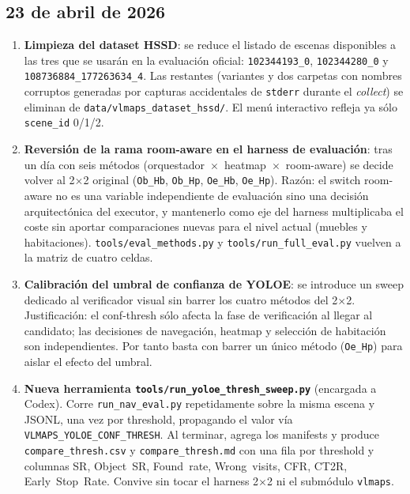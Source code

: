 \subsection*{23 de abril de 2026}

\begin{enumerate}

  \item \textbf{Limpieza del dataset HSSD}: se reduce el listado de escenas
        disponibles a las tres que se usarán en la evaluación oficial:
        \texttt{102344193\_0}, \texttt{102344280\_0} y
        \texttt{108736884\_177263634\_4}. Las restantes (variantes y dos
        carpetas con nombres corruptos generadas por capturas accidentales de
        \texttt{stderr} durante el \emph{collect}) se eliminan de
        \texttt{data/vlmaps\_dataset\_hssd/}. El menú interactivo refleja ya
        sólo \texttt{scene\_id} 0/1/2.

  \item \textbf{Reversión de la rama room-aware en el harness de evaluación}:
        tras un día con seis métodos
        (orquestador~$\times$~heatmap~$\times$~room-aware) se decide volver al
        2$\times$2 original (\texttt{Ob\_Hb}, \texttt{Ob\_Hp}, \texttt{Oe\_Hb},
        \texttt{Oe\_Hp}). Razón: el switch room-aware no es una variable
        independiente de evaluación sino una decisión arquitectónica del
        executor, y mantenerlo como eje del harness multiplicaba el coste sin
        aportar comparaciones nuevas para el nivel actual (muebles y
        habitaciones). \texttt{tools/eval\_methods.py} y
        \texttt{tools/run\_full\_eval.py} vuelven a la matriz de cuatro celdas.

  \item \textbf{Calibración del umbral de confianza de YOLOE}: se introduce un
        sweep dedicado al verificador visual sin barrer los cuatro métodos del
        2$\times$2. Justificación: el conf-thresh sólo afecta la fase de
        verificación al llegar al candidato; las decisiones de navegación,
        heatmap y selección de habitación son independientes. Por tanto basta
        con barrer un único método (\texttt{Oe\_Hp}) para aislar el efecto del
        umbral.

  \item \textbf{Nueva herramienta \texttt{tools/run\_yoloe\_thresh\_sweep.py}}
        (encargada a Codex). Corre \texttt{run\_nav\_eval.py} repetidamente
        sobre la misma escena y JSONL, una vez por threshold, propagando el
        valor vía \texttt{VLMAPS\_YOLOE\_CONF\_THRESH}. Al terminar, agrega los
        manifests y produce \texttt{compare\_thresh.csv} y
        \texttt{compare\_thresh.md} con una fila por threshold y columnas SR,
        Object~SR, Found~rate, Wrong~visits, CFR, CT2R, Early~Stop~Rate.
        Convive sin tocar el harness 2$\times$2 ni el submódulo \texttt{vlmaps}.


\end{enumerate}
